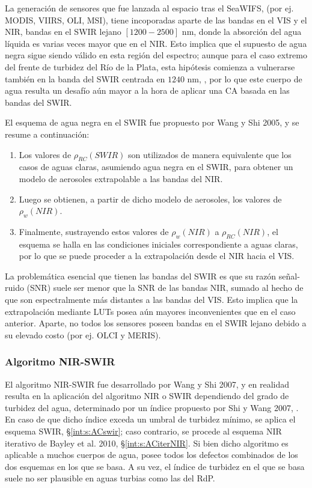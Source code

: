             La generación de sensores que fue lanzada al espacio tras el SeaWIFS, (por ej. MODIS, VIIRS, OLI, MSI), tiene incoporadas aparte de las bandas en el VIS y el NIR, bandas en el SWIR lejano $[1200 - 2500]$ nm, donde la absorción del agua líquida es varias veces mayor que en el NIR. Esto implica que el supuesto de agua negra sigue siendo válido en esta región del espectro; aunque para el caso extremo del frente de turbidez del Río de la Plata, esta hipótesis comienza a vulnerarse también en la banda del SWIR centrada en $1240$ nm, \cite{knaeps2012}, por lo que este cuerpo de agua resulta un desafío aún mayor a la hora de aplicar una CA basada en las bandas del SWIR.

            El esquema de agua negra en el SWIR fue propuesto por Wang y Shi 2005, \cite{wang2005} y se resume a continuación:

            \begin{enumerate}
                \item Los valores de $\rho_{RC}(SWIR)$ son utilizados de manera equivalente que los casos de aguas claras, asumiendo agua negra en el SWIR, para obtener un modelo de aerosoles extrapolable a las bandas del NIR.
                \item Luego se obtienen, a partir de dicho modelo de aerosoles, los valores de $\rho_{w}(NIR)$.
                \item Finalmente, sustrayendo estos valores de $\rho_{w}(NIR)$ a $\rho_{RC}(NIR)$, el esquema se halla en las condiciones iniciales correspondiente a aguas claras, por lo que se puede proceder a la extrapolación desde el NIR hacia el VIS.
            \end{enumerate}
            
            La problemática esencial que tienen las bandas del SWIR es que su razón señal-ruido (SNR) suele ser menor que la SNR de las bandas NIR, sumado al hecho de que son espectralmente más distantes a las bandas del VIS. Esto implica que la extrapolación mediante LUTs posea aún mayores inconvenientes que en el caso anterior. Aparte, no todos los sensores poseen bandas en el SWIR lejano debido a su elevado costo (por ej. OLCI y MERIS).

    	\subsubsection{Algoritmo NIR-SWIR}
    	\label{int:s:ACnirswir}
    	    El algoritmo NIR-SWIR fue desarrollado por Wang y Shi 2007, \cite{wang2007} y en realidad resulta en la aplicación del algoritmo NIR o SWIR dependiendo del grado de turbidez del agua, determinado por un índice propuesto por Shi y Wang 2007, \cite{shi2007}. En caso de que dicho índice exceda un umbral de turbidez mínimo, se aplica el esquema SWIR, \S \ref{int:s:ACswir}; caso contrario, se procede al esquema NIR iterativo de Bayley et al. 2010, \S \ref{int:s:ACiterNIR}. Si bien dicho algoritmo es aplicable a muchos cuerpos de agua, posee todos los defectos combinados de los dos esquemas en los que se basa. A su vez, el índice de turbidez en el que se basa suele no ser plausible en aguas turbias como las del RdP.

